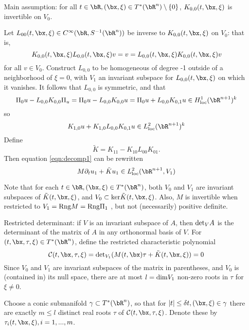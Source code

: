 Main assumption: for all $t \in \bR, (\bx,\xi) \in T^*(\bR^n)\setminus \{0\}$, $K_{0,0}(t,\bx,\xi)$ is invertible on $V_0$.


Let  $L_{00}(t,\bx,\xi) \in C^{\infty}(\bR, S^{-1}(\bR^n))$ be inverse to $K_{0,0}(t,\bx,\xi)$ on $V_0$: that is,
\[
  K_{0,0}(t,\bx,\xi)L_{0,0}(t,\bx,\xi) v=v=L_{0,0}(t,\bx,\xi)K_{0,0}(t,\bx,\xi)v
\]
for all $v \in V_0$. Construct $L_{0,0}$ to be homogeneous of degree -1 outside of a neighborhood of $\xi=0$, with $V_1$ an invariant subspace for $L_{0,0}(t,\bx,\xi)$ on which it vanishes. It follows that $L_{0,0}$ is symmetric, and that
\[
  \Pi_0 u - L_{0,0}K_{0,0}\Pi_u = \Pi_0 u - L_{0,0}K_{0,0}u = \Pi_0 u + L_{0,0}K_{0,1}u \in H^{1}_{\rm loc}(\bR^{n+1})^k
\]
so
\[
  K_{1,0}u + K_{1,0}L_{0,0}K_{0,1}u \in L^2 _{\rm loc}(\bR^{n+1})^k
\]
Define
\[
  \tilde{K} = K_{11} - K_{10}L_{00}K_{01}.
\]
Then equation \ref{eqn:decomp1} can be rewritten
\begin{equation}
  \label{eqn:shs1}
  M\partial_t u_1 + \tilde{K}u_1 \in L^2_{\rm loc}(\bR^{n+1},V_1)
\end{equation}

Note that for each $t \in \bR, (\bx,\xi) \in T^*(\bR^n)$, both $V_0$ and $V_1$ are invariant subspaces of $\tilde{K}(t,\bx,\xi)$, and $V_0 \subset {\rm ker}\tilde{K}(t,\bx,\xi)$. Also, $M$ is invertible when restricted to $V_1 = {\rm Rng} M = {\rm Rng } \Pi_1$ , but not (necessarily) positive definite.
  
Restricted determinant: if $V$ is an invariant subspace of $A$, then ${\rm det}_{V} A$ is the determinant of the matrix of $A$ in any orthonormal basis of $V$.
For $(t,\bx,\tau,\xi) \in T^*(\bR^n)$, define the restricted characteristic polynomial
\[
  {\cal C}(t,\bx,\tau,\xi) = {\rm det}_{V_1} (M(t,\bx)\tau + \tilde{K}(t,\bx,\xi) )= 0
\]
Since $V_0$ and $V_1$ are invariant subspaces of the matrix in parentheses, and $V_0$ is (contained in) its null space, there are at most $l={\rm dim}V_1$ non-zero roots in $\tau$ for $\xi \ne 0$.

Choose a conic submanifold $\gamma \subset T^*(\bR^n)$, so that for $|t| \le \delta t, (\bx,\xi) \in \gamma$ there are exactly $m \le l$ distinct real roots $\tau$ of ${\cal C}(t,\bx,\tau,\xi)$. Denote these by $\tau_i(t,\bx,\xi), i=1,...,m$.

